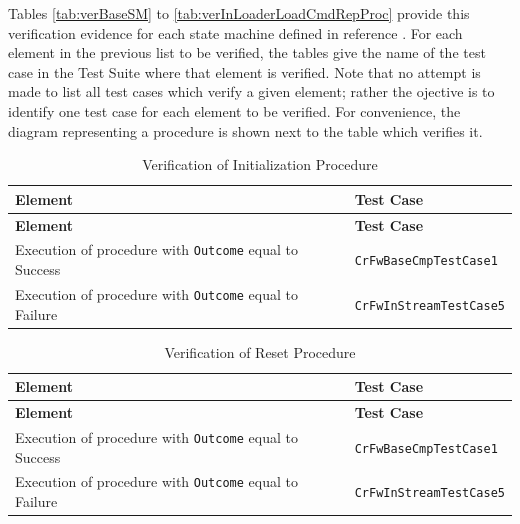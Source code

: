 \documentclass[a4paper,10pt]{article}
\begin{document}
Tables \ref{tab:verBaseSM} to \ref{tab:verInLoaderLoadCmdRepProc} provide this verification evidence for each state machine defined in reference \cite{ref:cordetfw}. For each element in the previous list to be verified, the tables give the name of the test case in the Test Suite where that element is verified. Note that no attempt is made to list all test cases which verify a given element; rather the ojective is to identify one test case for each element to be verified. For convenience, the diagram representing a procedure is shown next to the table which verifies it.

\begin{longtable}{|>{\raggedright}p{7.0cm}|P{4.0cm}|}
\caption{Verification of Initialization Procedure}
\label{tab:verInitProc}\\
\hline
{}
\textbf{Element} & \textbf{Test Case} \\
\hline
\endfirsthead
{}
\textbf{Element} & \textbf{Test Case} \\
\hline
\endhead
Execution of procedure with \texttt{Outcome} equal to Success & \texttt{CrFwBaseCmpTestCase1}\\
\hline
Execution of procedure with \texttt{Outcome} equal to Failure & \texttt{CrFwInStreamTestCase5}\\
\hline
\end{longtable}

\begin{longtable}{|>{\raggedright}p{6.0cm}|P{5.0cm}|}
\caption{Verification of Reset Procedure}
\label{tab:verResetProc}\\
\hline
{}
\textbf{Element} & \textbf{Test Case} \\
\hline
\endfirsthead
{}
\textbf{Element} & \textbf{Test Case} \\
\hline
\endhead
Execution of procedure with \texttt{Outcome} equal to Success & \texttt{CrFwBaseCmpTestCase1}\\
\hline
Execution of procedure with \texttt{Outcome} equal to Failure & \texttt{CrFwInStreamTestCase5}\\
\hline
\end{longtable}
\end{document}
